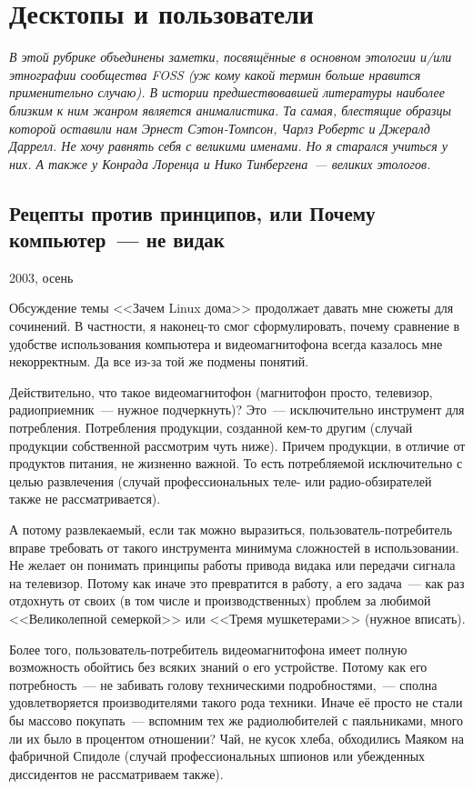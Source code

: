 \chapter{Десктопы и пользователи}

\textsl{В этой рубрике объединены заметки, посвящённые в основном этологии и/или этнографии сообщества FOSS (уж кому какой термин больше нравится применительно случаю). В истории предшествовавшей литературы наиболее близким к ним жанром является анималистика. Та самая, блестящие образцы которой оставили нам Эрнест Сэтон-Томпсон, Чарлз Робертс и Джералд Даррелл. Не хочу равнять себя с великими именами. Но я старался учиться у них. А также у Конрада Лоренца и Нико Тинбергена~--- великих этологов.}
\section{Рецепты против принципов, или Почему компьютер~--- не видак} 
\begin{timeline}
2003, осень
\end{timeline}

Обсуждение темы <<Зачем Linux дома>> продолжает давать мне сюжеты для сочинений. В частности, я наконец-то смог сформулировать, почему сравнение в удобстве использования компьютера и видеомагнитофона всегда казалось мне некорректным. Да все из-за той же подмены понятий.

Действительно, что такое видеомагнитофон (магнитофон просто, телевизор, радиоприемник~--- нужное подчеркнуть)? Это~--- исключительно инструмент для потребления. Потребления продукции, созданной кем-то другим (случай продукции собственной рассмотрим чуть ниже). Причем продукции, в отличие от продуктов питания, не жизненно важной. То есть потребляемой исключительно с целью развлечения (случай профессиональных теле- или радио-обзирателей также не рассматривается).

А потому развлекаемый, если так можно выразиться, пользователь-потребитель вправе требовать от такого инструмента минимума сложностей в использовании. Не желает он понимать принципы работы привода видака или передачи сигнала на телевизор. Потому как иначе это превратится в работу, а его задача~--- как раз отдохнуть от своих (в том числе и производственных) проблем за любимой <<Великолепной семеркой>> или <<Тремя мушкетерами>> (нужное вписать).

Более того, пользователь-потребитель видеомагнитофона имеет полную возможность обойтись без всяких знаний о его устройстве. Потому как его потребность~--- не забивать голову техническими подробностями,~--- сполна удовлетворяется производителями такого рода техники. Иначе её просто не стали бы массово покупать~--- вспомним тех же радиолюбителей с паяльниками, много ли их было в процентом отношении? Чай, не кусок хлеба, обходились Маяком на фабричной Спидоле (случай профессиональных шпионов или убежденных диссидентов не рассматриваем также).

